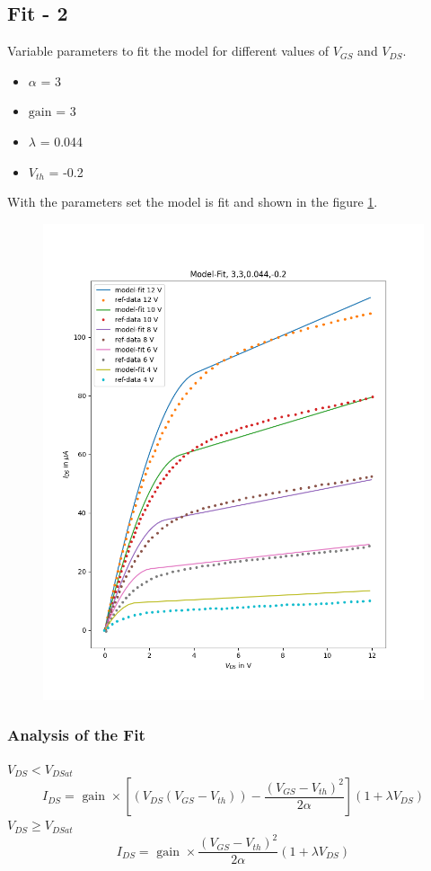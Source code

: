 \documentclass{article}
\begin{document}
\subsection*{Fit - 2}
Variable parameters to fit the model for different values of $V_{GS}$ and $V_{DS}$. 
\begin{itemize}
    \item $\alpha$ = 3
    \item $\text{gain}$ = 3
    \item $\lambda$ = 0.044
    \item $V_{th}$ = -0.2
\end{itemize}
With the parameters set the model is fit and shown in the figure \ref{fig:model-fit-2}.
\begin{figure}
    \label{fig:model-fit-2}
    \includegraphics[scale = 0.4]{../Images/Previous/Model-Fit-3-3-0.044--0.2.png}
\end{figure}
\subsubsection*{Analysis of the Fit}
\textbf{$V_{DS}< V_{DSat}$}
\begin{equation}
    I_{DS} = \text{ gain }\times \left[(V_{DS}(V_{GS}-V_{th})) - \frac{(V_{GS}-V_{th})^2}{2 \alpha}\right](1 + \lambda V_{DS})
\end{equation}
\textbf{$V_{DS}\geq V_{DSat}$}
\begin{equation}
    I_{DS} =\text{ gain }\times \frac{(V_{GS}-V_{th})^2}{2\alpha} (1 + \lambda V_{DS})
\end{equation}
\newpage
\end{document}
